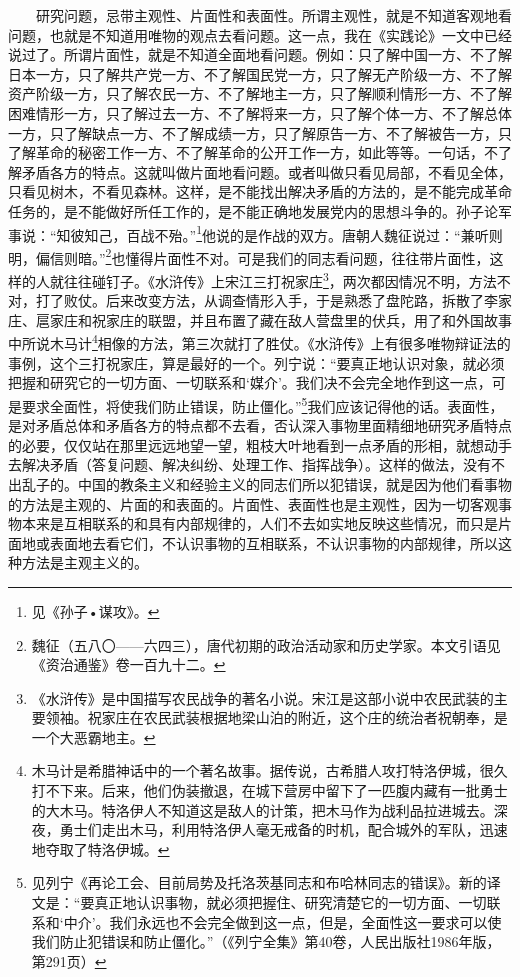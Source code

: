 \documentclass[cn,11pt,chinese]{elegantbook}
\begin{document}
　　研究问题，忌带主观性、片面性和表面性。所谓主观性，就是不知道客观地看问题，也就是不知道用唯物的观点去看问题。这一点，我在《实践论》一文中已经说过了。所谓片面性，就是不知道全面地看问题。例如：只了解中国一方、不了解日本一方，只了解共产党一方、不了解国民党一方，只了解无产阶级一方、不了解资产阶级一方，只了解农民一方、不了解地主一方，只了解顺利情形一方、不了解困难情形一方，只了解过去一方、不了解将来一方，只了解个体一方、不了解总体一方，只了解缺点一方、不了解成绩一方，只了解原告一方、不了解被告一方，只了解革命的秘密工作一方、不了解革命的公开工作一方，如此等等。一句话，不了解矛盾各方的特点。这就叫做片面地看问题。或者叫做只看见局部，不看见全体，只看见树木，不看见森林。这样，是不能找出解决矛盾的方法的，是不能完成革命任务的，是不能做好所任工作的，是不能正确地发展党内的思想斗争的。孙子论军事说：“知彼知己，百战不殆。”\footnote[12]{ 见《孙子•谋攻》。}他说的是作战的双方。唐朝人魏征说过：“兼听则明，偏信则暗。”\footnote[13]{ 魏征（五八〇——六四三），唐代初期的政治活动家和历史学家。本文引语见《资治通鉴》卷一百九十二。}也懂得片面性不对。可是我们的同志看问题，往往带片面性，这样的人就往往碰钉子。《水浒传》上宋江三打祝家庄\footnote[14]{ 《水浒传》是中国描写农民战争的著名小说。宋江是这部小说中农民武装的主要领袖。祝家庄在农民武装根据地梁山泊的附近，这个庄的统治者祝朝奉，是一个大恶霸地主。}，两次都因情况不明，方法不对，打了败仗。后来改变方法，从调查情形入手，于是熟悉了盘陀路，拆散了李家庄、扈家庄和祝家庄的联盟，并且布置了藏在敌人营盘里的伏兵，用了和外国故事中所说木马计\footnote[15]{ 木马计是希腊神话中的一个著名故事。据传说，古希腊人攻打特洛伊城，很久打不下来。后来，他们伪装撤退，在城下营房中留下了一匹腹内藏有一批勇士的大木马。特洛伊人不知道这是敌人的计策，把木马作为战利品拉进城去。深夜，勇士们走出木马，利用特洛伊人毫无戒备的时机，配合城外的军队，迅速地夺取了特洛伊城。}相像的方法，第三次就打了胜仗。《水浒传》上有很多唯物辩证法的事例，这个三打祝家庄，算是最好的一个。列宁说：“要真正地认识对象，就必须把握和研究它的一切方面、一切联系和‘媒介’。我们决不会完全地作到这一点，可是要求全面性，将使我们防止错误，防止僵化。”\footnote[16]{ 见列宁《再论工会、目前局势及托洛茨基同志和布哈林同志的错误》。新的译文是：“要真正地认识事物，就必须把握住、研究清楚它的一切方面、一切联系和‘中介’。我们永远也不会完全做到这一点，但是，全面性这一要求可以使我们防止犯错误和防止僵化。”（《列宁全集》第40卷，人民出版社1986年版，第291页）}我们应该记得他的话。表面性，是对矛盾总体和矛盾各方的特点都不去看，否认深入事物里面精细地研究矛盾特点的必要，仅仅站在那里远远地望一望，粗枝大叶地看到一点矛盾的形相，就想动手去解决矛盾（答复问题、解决纠纷、处理工作、指挥战争）。这样的做法，没有不出乱子的。中国的教条主义和经验主义的同志们所以犯错误，就是因为他们看事物的方法是主观的、片面的和表面的。片面性、表面性也是主观性，因为一切客观事物本来是互相联系的和具有内部规律的，人们不去如实地反映这些情况，而只是片面地或表面地去看它们，不认识事物的互相联系，不认识事物的内部规律，所以这种方法是主观主义的。\\
\end{document}
